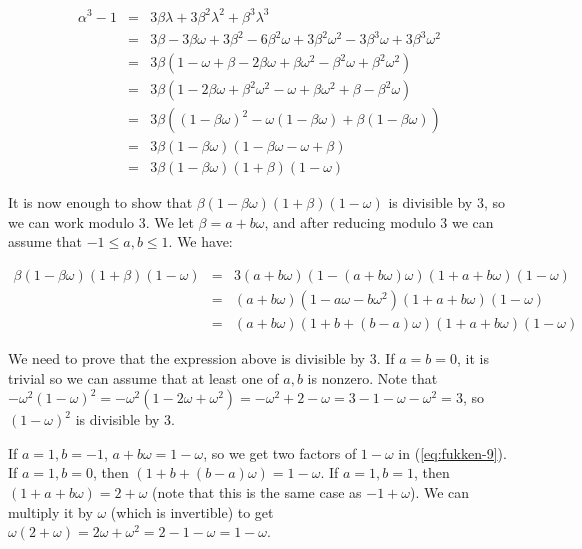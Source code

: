 \documentclass[notitlepage]{article}
\theoremstyle{definition}
\begin{document}
\begin{eqnarray}
  \alpha^3 - 1 &=& 3 \beta \lambda + 3 \beta^2 \lambda^2 + \beta^3
  \lambda^3 \\ &=& 3 \beta - 3 \beta \omega + 3 \beta^2 - 6 \beta^2
  \omega + 3 \beta^2 \omega^2 - 3 \beta^3 \omega + 3 \beta^3 \omega^2
  \\ &=& 3 \beta(1 - \omega + \beta - 2 \beta \omega + \beta \omega^2
  - \beta^2 \omega + \beta^2 \omega^2) \\ &=& 3\beta(1 - 2 \beta
  \omega + \beta^2 \omega^2 - \omega + \beta \omega^2 + \beta -
  \beta^2 \omega) \\ &=& 3 \beta((1 - \beta \omega)^2 - \omega(1 -
  \beta \omega) + \beta(1 - \beta \omega)) \\ &=& 3 \beta (1 - \beta
  \omega)(1 - \beta \omega - \omega + \beta) \\ &=& 3 \beta (1 - \beta
  \omega)(1 + \beta)(1- \omega)
\end{eqnarray}

It is now enough to show that $\beta (1 - \beta \omega)(1 + \beta)(1-
\omega)$ is divisible by $3$, so we can work modulo $3$. We let $\beta
= a + b \omega$, and after reducing modulo $3$ we can assume that $-1
\leq a, b \leq 1$. We have:

\begin{eqnarray}
  \label{eq:fukken-9}
   \beta (1 - \beta \omega)(1 + \beta)(1- \omega) &=& 3(a +
   b\omega)(1-(a + b \omega)\omega)(1 + a + b \omega)(1-\omega) \\ &=&
   (a + b\omega)(1-a \omega - b \omega^2)(1 + a + b \omega)(1-\omega)
   \\ &=& (a + b\omega)(1+b +(b-a) \omega)(1 + a + b \omega)(1-\omega)
\end{eqnarray}

We need to prove that the expression above is divisible by 3. If $a =
b = 0$, it is trivial so we can assume that at least one of $a, b$ is
nonzero.  Note that $-\omega^2 (1-\omega)^2 = -\omega^2 (1 - 2 \omega
+ \omega^2) = - \omega^2 + 2 - \omega = 3 - 1 - \omega - \omega^2 =
3$, so $(1-\omega)^2$ is divisible by $3$.

If $a = 1, b = -1$, $a + b \omega = 1 - \omega$, so we get two factors
of $1-\omega$ in (\ref{eq:fukken-9}). If $a = 1, b = 0$, then $(1+b
+(b-a) \omega) = 1 - \omega$. If $a = 1, b = 1$, then $(1+a+b\omega) =
2 + \omega$ (note that this is the same case as $-1 + \omega$). We can
multiply it by $\omega$ (which is invertible) to get $\omega(2 +
\omega) = 2 \omega + \omega^2 = 2 - 1 - \omega = 1 - \omega$.
\end{document}
